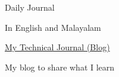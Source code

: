 \begin{cventries}
  \cventry
    {Daily Journal}
    {}
    {}
    {}
    {
      \begin{cvitems}
        \item {In English and Malayalam}
      \end{cvitems}
    }
  \cventry
    {\href{https://yedhukrishnan.blogspot.in/}{My Technical Journal (Blog)}}
    {}
    {}
    {}
    {
      \begin{cvitems}
        \item {My blog to share what I learn}
      \end{cvitems}
    }
\end{cventries}
